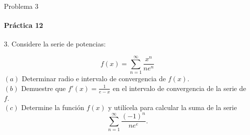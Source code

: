 \documentclass{plantillaPPT}
\begin{document}
\begin{frame}{Problema 3}
    \framesubtitle{Práctica 12}

    3. Considere la serie de potencias:

    \begin{equation*}
        f(x) = \sum_{n=1}^{\infty}\frac{x^n}{ne^n}        
    \end{equation*}
    $(a)$ Determinar radio e intervalo de convergencia de $f(x)$. \\
    $(b)$ Demuestre que $f'(x)=\frac{1}{e-x}$ en el intervalo de convergencia de la serie de $f$. \\
    $(c)$ Determine la función $f(x)$ y utilícela para calcular la suma de la serie
    \begin{equation*}
        \sum_{n=1}^{\infty}\frac{(-1)^n}{ne^e}.
    \end{equation*}
\end{frame}
\end{document}

